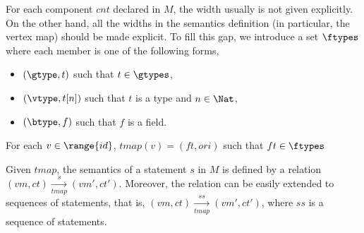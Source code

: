 
For each component $cnt$ declared in $M$, the width usually is not given explicitly. %
On the other hand, all the widths in %
the semantics definition (in particular, the vertex map) should be made explicit. To fill this gap, 
%
we introduce a set $\ftypes$ where each member is %
one of the following forms, 
\begin{itemize}
\item $(\gtype, t)$ such that $t \in \gtypes$, 
%
\item $(\vtype, t[n])$ such that $t$ is a type and $n \in \Nat$, 
%
\item $(\btype, f)$ such that $f$ is a field. 
\end{itemize}



For each $v \in \range{id}$, $tmap(v) = (ft, ori)$ such that $ft \in \ftypes$ %
%
%


Given $tmap$, the semantics of a statement $s$ in $M$ is defined by a relation $(vm, ct) \xrightarrow[tmap]{s} (vm', ct')$. %
Moreover, the relation can be easily extended to sequences of statements, that is, $(vm, ct) \xrightarrow[tmap]{ss} (vm', ct')$, where $ss$ is a sequence of statements. 
       
